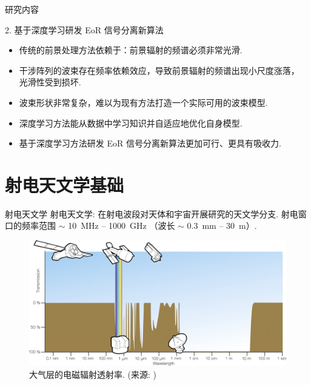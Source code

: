 \documentclass{beamer}
\newcommand{\citeay}[1]{\citeauthor{#1} \citeyear{#1} \parencite{#1}}
\begin{document}
\begin{frame}{研究内容}
  \begin{alertblock}{2. 基于深度学习研发 EoR 信号分离新算法}
    \begin{itemize}
      \item 传统的前景处理方法依赖于：前景辐射的频谱必须非常光滑.
      \item 干涉阵列的波束存在频率依赖效应，导致前景辐射的频谱出现小尺度涨落，
        光滑性受到损坏.
      \item 波束形状非常复杂，难以为现有方法打造一个实际可用的波束模型.
      \item 深度学习方法能从数据中学习知识并自适应地优化自身模型.
      \item 基于深度学习方法研发 EoR 信号分离新算法更加可行、更具有吸收力.
    \end{itemize}
  \end{alertblock}
\end{frame}


\section{射电天文学基础}

\begin{frame}{射电天文学}
  \alert{射电天文学}:
  在射电波段对天体和宇宙开展研究的天文学分支.
  \alert{射电窗口}的频率范围 $\sim$ \SI{10}{\MHz} -- \SI{1000}{\GHz}
  （波长 $\sim$ \SI{0.3}{\mm} -- \SI{30}{\meter}）.

  \begin{figure}
    \centering
    \includegraphics[width=\textwidth]{atmospheric-em-transmittance}
    \caption{大气层的电磁辐射透射率. (来源: \citeay{condon2016})}
  \end{figure}
\end{frame}
\end{document}
